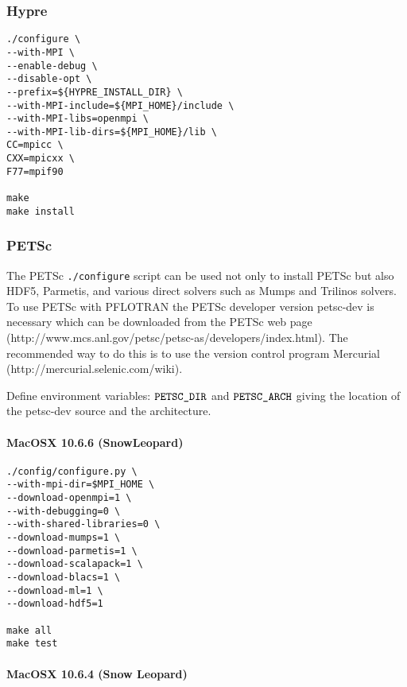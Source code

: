 \documentclass[12pt]{article}
\begin{document}
\subsubsection{Hypre}

\begin{verbatim}
./configure \
--with-MPI \
--enable-debug \
--disable-opt \
--prefix=${HYPRE_INSTALL_DIR} \
--with-MPI-include=${MPI_HOME}/include \
--with-MPI-libs=openmpi \
--with-MPI-lib-dirs=${MPI_HOME}/lib \
CC=mpicc \
CXX=mpicxx \
F77=mpif90

make
make install
\end{verbatim}

\subsubsection{PETSc}

The PETSc {\tt ./configure} script can be used not only to install PETSc but also HDF5, Parmetis, and various direct solvers such as Mumps and Trilinos solvers. To use PETSc with PFLOTRAN the PETSc developer version petsc-dev is necessary which can be downloaded from the PETSc web page (http://www.mcs.anl.gov/petsc/petsc-as/developers/index.html). The recommended way to do this is to use the version control program Mercurial \linebreak (http://mercurial.selenic.com/wiki).

Define environment variables: $\verb|PETSC_DIR|$ and $\verb|PETSC_ARCH|$ giving the location of the petsc-dev source and the architecture.

\paragraph{MacOSX 10.6.6 (SnowLeopard)}

\begin{verbatim}
./config/configure.py \
--with-mpi-dir=$MPI_HOME \
--download-openmpi=1 \
--with-debugging=0 \
--with-shared-libraries=0 \
--download-mumps=1 \
--download-parmetis=1 \
--download-scalapack=1 \
--download-blacs=1 \
--download-ml=1 \
--download-hdf5=1 

make all
make test
\end{verbatim}

\paragraph{MacOSX 10.6.4 (Snow Leopard)}
\end{document}
